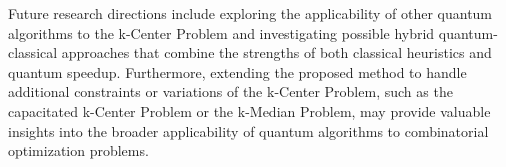 Future research directions include exploring the applicability of other quantum algorithms to the k-Center Problem and investigating possible hybrid quantum-classical approaches that combine the strengths of both classical heuristics and quantum speedup. Furthermore, extending the proposed method to handle additional constraints or variations of the k-Center Problem, such as the capacitated k-Center Problem or the k-Median Problem, may provide valuable insights into the broader applicability of quantum algorithms to combinatorial optimization problems.

